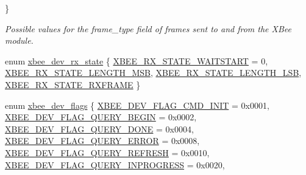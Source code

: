\begin{DoxyCompactItemize}
 \}\begin{DoxyCompactList}\small\item\em Possible values for the {\ttfamily frame\+\_\+type} field of frames sent to and from the X\+Bee module. \end{DoxyCompactList}
\item 
enum \hyperlink{group__xbee__device_ga30374ada0aff261c5da7557882fd09de}{xbee\+\_\+dev\+\_\+rx\+\_\+state} \{ \hyperlink{group__xbee__device_gga30374ada0aff261c5da7557882fd09deae0a149adbaecdd2c5d84a1ed006e01a3}{X\+B\+E\+E\+\_\+\+R\+X\+\_\+\+S\+T\+A\+T\+E\+\_\+\+W\+A\+I\+T\+S\+T\+A\+RT} = 0, 
\hyperlink{group__xbee__device_gga30374ada0aff261c5da7557882fd09dea641dccc2bf7a54d9108a7d3a1aa94dfc}{X\+B\+E\+E\+\_\+\+R\+X\+\_\+\+S\+T\+A\+T\+E\+\_\+\+L\+E\+N\+G\+T\+H\+\_\+\+M\+SB}, 
\hyperlink{group__xbee__device_gga30374ada0aff261c5da7557882fd09deafc90aadcdd6ea17637198aadd9d85efd}{X\+B\+E\+E\+\_\+\+R\+X\+\_\+\+S\+T\+A\+T\+E\+\_\+\+L\+E\+N\+G\+T\+H\+\_\+\+L\+SB}, 
\hyperlink{group__xbee__device_gga30374ada0aff261c5da7557882fd09deae7792cb93b09dde7b061947daffcb35a}{X\+B\+E\+E\+\_\+\+R\+X\+\_\+\+S\+T\+A\+T\+E\+\_\+\+R\+X\+F\+R\+A\+ME}
 \}
\item 
enum \hyperlink{group__xbee__device_ga80478d6b87ebdf34b5ec06e5ca6f309e}{xbee\+\_\+dev\+\_\+flags} \{ \newline
\hyperlink{group__xbee__device_gga80478d6b87ebdf34b5ec06e5ca6f309ea7227a8ae75aa792a17e24d20f1a5a4a8}{X\+B\+E\+E\+\_\+\+D\+E\+V\+\_\+\+F\+L\+A\+G\+\_\+\+C\+M\+D\+\_\+\+I\+N\+IT} = 0x0001, 
\hyperlink{group__xbee__device_gga80478d6b87ebdf34b5ec06e5ca6f309ea28b7d1589252302b80f10a627656a6c5}{X\+B\+E\+E\+\_\+\+D\+E\+V\+\_\+\+F\+L\+A\+G\+\_\+\+Q\+U\+E\+R\+Y\+\_\+\+B\+E\+G\+IN} = 0x0002, 
\hyperlink{group__xbee__device_gga80478d6b87ebdf34b5ec06e5ca6f309ead04b8cb5ede9e940335559b26aa5399f}{X\+B\+E\+E\+\_\+\+D\+E\+V\+\_\+\+F\+L\+A\+G\+\_\+\+Q\+U\+E\+R\+Y\+\_\+\+D\+O\+NE} = 0x0004, 
\hyperlink{group__xbee__device_gga80478d6b87ebdf34b5ec06e5ca6f309ea7dbd64bc34a6a405582cc92d6460921a}{X\+B\+E\+E\+\_\+\+D\+E\+V\+\_\+\+F\+L\+A\+G\+\_\+\+Q\+U\+E\+R\+Y\+\_\+\+E\+R\+R\+OR} = 0x0008, 
\newline
\hyperlink{group__xbee__device_gga80478d6b87ebdf34b5ec06e5ca6f309ea08b02fa597f36fd613370d28ab5a0e81}{X\+B\+E\+E\+\_\+\+D\+E\+V\+\_\+\+F\+L\+A\+G\+\_\+\+Q\+U\+E\+R\+Y\+\_\+\+R\+E\+F\+R\+E\+SH} = 0x0010, 
\hyperlink{group__xbee__device_gga80478d6b87ebdf34b5ec06e5ca6f309ea5f1d6c0ecfad680a292b57e8b078e357}{X\+B\+E\+E\+\_\+\+D\+E\+V\+\_\+\+F\+L\+A\+G\+\_\+\+Q\+U\+E\+R\+Y\+\_\+\+I\+N\+P\+R\+O\+G\+R\+E\+SS} = 0x0020, 

\end{DoxyCompactItemize}
